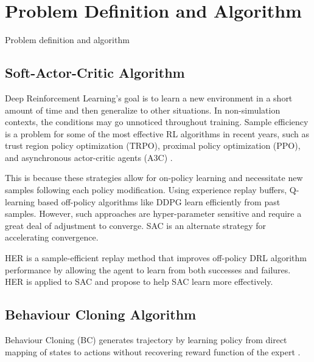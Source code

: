 \documentclass{svproc}
\begin{document}
\section{Problem Definition and Algorithm}
Problem definition and algorithm

\subsection{Soft-Actor-Critic Algorithm}
Deep Reinforcement Learning’s goal is to learn a new environment in a short amount of time and then generalize to other situations. In non-simulation contexts, the conditions may go unnoticed throughout training. Sample efficiency is a problem for some of the most effective RL algorithms in recent years, such as trust region policy optimization (TRPO), proximal policy optimization (PPO), and asynchronous actor-critic agents (A3C) \cite{sloss20202019}.

This is because these strategies allow for on-policy learning and necessitate new samples following each policy modification. Using experience replay buffers, Q-learning based off-policy algorithms like DDPG learn efficiently from past samples. However, such approaches are hyper-parameter sensitive and require a great deal of adjustment to converge. SAC is an alternate strategy for accelerating convergence.

HER is a sample-efficient replay method that improves off-policy DRL algorithm performance by allowing the agent to learn from both successes and failures. HER is applied to SAC and propose to help SAC learn more effectively. 


\subsection{Behaviour Cloning Algorithm}
Behaviour Cloning (BC) generates trajectory by learning policy from direct mapping of states to actions without recovering reward function of the expert \cite{osa2018algorithmic}.
\end{document}
